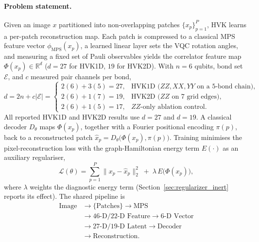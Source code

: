 \documentclass[pdflatex,sn-basic]{sn-jnl}
\begin{document}
\paragraph{Problem statement.}
Given an image $x$ partitioned into non-overlapping patches
$\{x_p\}_{p=1}^{P}$, HVK learns a per-patch reconstruction map. Each patch is
compressed to a classical MPS feature vector $\phi_{\mathrm{MPS}}(x_p)$, a learned
linear layer sets the VQC rotation angles, and measuring a fixed set of Pauli
observables yields the correlator feature map
$\Phi(x_p)\in\mathbb{R}^{d}$ ($d=27$ for HVK1D, $19$ for HVK2D). {\color{red}%
With $n=6$ qubits, bond set $\mathcal{E}$, and $c$ measured pair channels per bond,
\begin{equation}
  \label{eq:obs_dim}
  d=2n+c\lvert\mathcal{E}\rvert=
  \begin{cases}
    2(6)+3(5)=27, & \text{HVK1D ($ZZ,XX,YY$ on a 5-bond chain)},\\
    2(6)+1(7)=19, & \text{HVK2D ($ZZ$ on 7 grid edges)},\\
    2(6)+1(5)=17, & \text{$ZZ$-only ablation control}.
  \end{cases}
\end{equation}
All reported HVK1D and HVK2D results use $d=27$ and $d=19$.}
A classical
decoder $D_\theta$ maps $\Phi(x_p)$, together with a Fourier positional encoding
$\pi(p)$, back to a reconstructed patch $\hat{x}_p=D_\theta\!\big(\Phi(x_p),\pi(p)\big)$.
Training minimises the pixel-reconstruction loss with the graph-Hamiltonian energy
term $E(\cdot)$ as an auxiliary regulariser,
\begin{equation}
  \label{eq:objective}
  \mathcal{L}(\theta)=\sum_{p=1}^{P}\big\|x_p-\hat{x}_p\big\|_2^{2}
  \;+\;\lambda\,E\big(\Phi(x_p)\big),
\end{equation}
where $\lambda$ weights the diagnostic energy term (Section~\ref{sec:regularizer_inert}
reports its effect). The shared pipeline is
\begin{equation}
\begin{aligned}
\text{Image}
  &\rightarrow \{\text{Patches}\} \rightarrow \text{MPS}\\
  &\rightarrow \text{46-D/22-D Feature} \rightarrow \text{6-D Vector}\\
  &\rightarrow \text{27-D/19-D Latent} \rightarrow \text{Decoder}\\
  &\rightarrow \text{Reconstruction}.
\end{aligned}
\end{equation}
\end{document}
